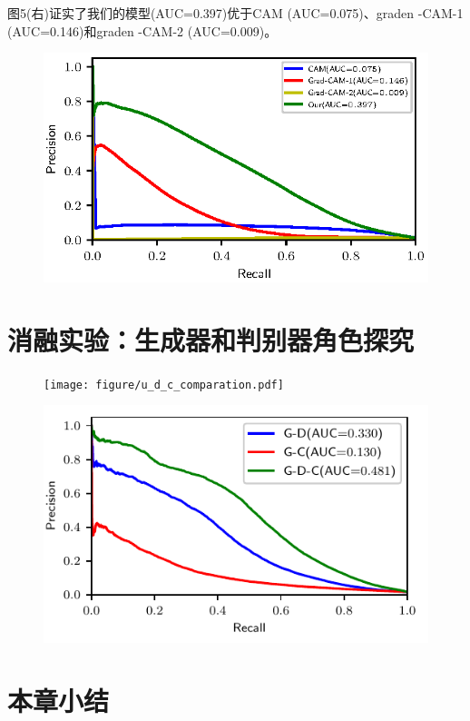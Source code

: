 图5(右)证实了我们的模型(AUC=0.397)优于CAM (AUC=0.075)、graden -CAM-1 (AUC=0.146)和graden -CAM-2 (AUC=0.009)。


\begin{figure}[h]
	\centering
	\includegraphics[width=1.0\textwidth]{figure/pr_curve_skin_image/pr_curve.eps}
	\caption{}
	\label{fig:simulated_skin_pr_curve}
\end{figure}

\section{消融实验：生成器和判别器角色探究}
\begin{figure}[h]
	\centering
	\texttt{[image: figure/u\_d\_c\_comparation.pdf]}
	\caption{} 
	\label{fig:u_d_c_comparation}
\end{figure}
\begin{figure}[h]
	\centering
	\includegraphics[width=1.0\textwidth]{figure/pr_cureve_u_d_u_c_u_d_c_components.pdf}
	\caption{} 
	\label{fig:u_d_c_comparation_pr_curve}
\end{figure}

\section{本章小结}



